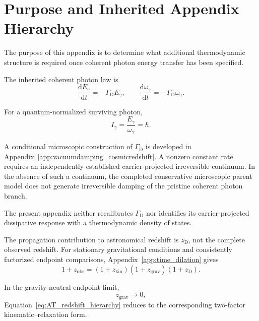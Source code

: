 \section{Purpose and Inherited Appendix Hierarchy}

The purpose of this appendix is to determine what additional thermodynamic
structure is required once coherent photon energy transfer has been
specified.

The inherited coherent photon law is
\begin{equation}
    \frac{\mathrm dE_\gamma}{\mathrm dt}
    =
    -\Gamma_{\mathrm D}E_\gamma,
    \qquad
    \frac{\mathrm d\omega_\gamma}{\mathrm dt}
    =
    -\Gamma_{\mathrm D}\omega_\gamma.
    \label{eq:AT_coherent_transport}
\end{equation}

For a quantum-normalized surviving photon,
\begin{equation}
    I_\gamma
    =
    \frac{E_\gamma}{\omega_\gamma}
    =
    \hbar.
    \label{eq:AT_action}
\end{equation}

A conditional microscopic construction of
\(\Gamma_{\mathrm D}\)
is developed in
Appendix~\ref{app:vacuumdamping_cosmicredshift}.
A nonzero constant rate requires an independently established
carrier-projected irreversible continuum. In the absence of such a
continuum, the completed conservative microscopic parent model does not
generate irreversible damping of the pristine coherent photon branch.

The present appendix neither recalibrates
\(\Gamma_{\mathrm D}\)
nor identifies its carrier-projected dissipative response with a
thermodynamic density of states.

The propagation contribution to astronomical redshift is
\(z_{\mathrm D}\), not the complete observed redshift. For stationary
gravitational conditions and consistently factorized endpoint comparisons,
Appendix~\ref{app:time_dilation} gives
\begin{equation}
    \boxed{
    1+z_{\mathrm{obs}}
    =
    (1+z_{\mathrm{kin}})
    (1+z_{\mathrm{grav}})
    (1+z_{\mathrm D}).
    }
    \label{eq:AT_redshift_hierarchy}
\end{equation}

In the gravity-neutral endpoint limit,
\begin{equation}
    z_{\mathrm{grav}}
    \rightarrow
    0,
\end{equation}
Equation~\eqref{eq:AT_redshift_hierarchy} reduces to the corresponding
two-factor kinematic--relaxation form.

